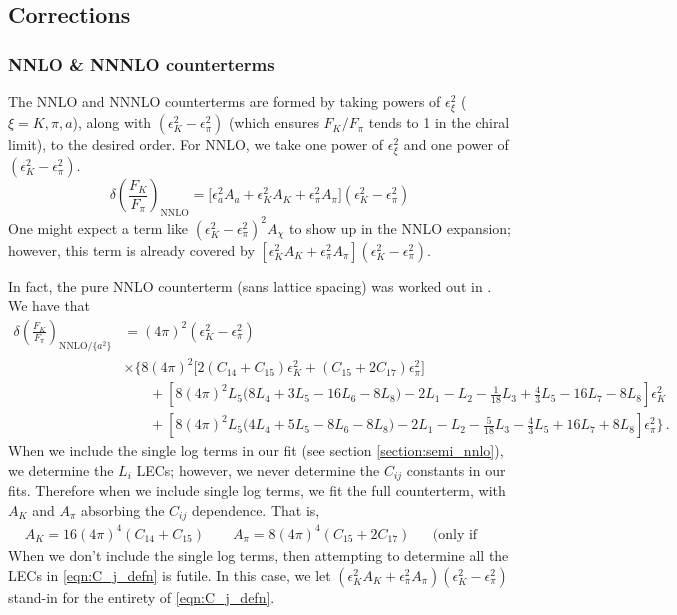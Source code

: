 \documentclass[prd,tightenlines,preprintnumbers,showpacs,superscriptaddress,notitlepage,eqsecnum,floatfix,notitlepage]{revtex4-1}
\begin{document}
\subsection{Corrections}

\subsubsection{NNLO \& NNNLO counterterms}
The NNLO and NNNLO counterterms are formed by taking powers of $\epsilon^2_\xi$ ($\xi = K, \pi, a$), along with $(\epsilon_K^2 - \epsilon_\pi^2)$ (which ensures $F_K / F_\pi$ tends to 1 in the chiral limit), to the desired order. For NNLO, we take one power of $\epsilon^2_\xi$ and one power of $(\epsilon_K^2 - \epsilon_\pi^2)$.
\begin{equation}
\delta\left(\frac{F_K}{F_\pi}\right)_\text{NNLO} = \bigg[
\epsilon_a^2  A_{a}
+\epsilon_K^2  A_{K}
+\epsilon_\pi^2  A_{\pi}
\bigg] (\epsilon_K^2 - \epsilon_\pi^2)
\end{equation}
One might expect a term like $(\epsilon_K^2 - \epsilon_\pi^2)^2 A_{\chi}$ to show up in the NNLO expansion; however, this term is already covered by $[\epsilon_K^2  A_{K}+\epsilon_\pi^2  A_{\pi}] (\epsilon_K^2 - \epsilon_\pi^2)$.

In fact, the pure NNLO counterterm (sans lattice spacing) was worked out in  \cite{Ananthanarayan:2017qmx}. We have that
\begin{align} \label{eqn:C_j_defn}
\delta\left(\frac{F_K}{F_\pi}\right)_{\text{NNLO} / \{a^2 \}}
&= (4 \pi)^2 \left(\epsilon_K^2 - \epsilon_\pi^2\right) \\
&\times \Bigg\{ 
8 (4 \pi)^2 \big[ 2 \left(C_{14} + C_{15}\right) \epsilon_K^2 + \left( C_{15} + 2 C_{17} \right) \epsilon_\pi^2 \big] \nonumber \\
&\phantom{= \Bigg\}} +  \left[ 8 (4 \pi)^2 L_5  \big( 8 L_4 + 3L_5 - 16 L_6 -8L_8 \big)
-2 L_1 - L_2 - \frac{1}{18} L_3 + \frac{4}{3} L_5 - 16 L_7 - 8 L_8
\right] \epsilon_K^2 \nonumber \\
&\phantom{= \Bigg\}} +  \left[ 8 (4 \pi)^2  L_5  \big( 4 L_4 + 5 L_5 - 8 L_6 - 8 L_8 \big)
-2 L_1 - L_2 - \frac{5}{18} L_3 - \frac{4}{3} L_5 + 16 L_7 + 8 L_8
\right] \epsilon_\pi^2 \nonumber 
\Bigg\} \, .
\end{align}
When we include the single log terms in our fit (see section \ref{section:semi_nnlo}), we determine the $L_i$ LECs; however, we never determine the $C_{ij}$ constants in our fits. Therefore when we include single log terms, we fit the full counterterm, with $A_K$ and $A_\pi$ absorbing the $C_{ij}$ dependence. That is,
\begin{align}
&A_K = 16 (4 \pi)^4 (C_{14} + C_{15}) \qquad A_\pi = 8 (4 \pi)^4 (C_{15} + 2 C_{17}) &&  \text{(only if including single log terms)}
\end{align}
When we don't include the single log terms, then attempting to determine all the LECs in \eqref{eqn:C_j_defn} is futile. In this case, we let $(\epsilon_K^2  A_{K} +\epsilon_\pi^2  A_{\pi}) (\epsilon_K^2 - \epsilon_\pi^2)$ stand-in for the entirety of \eqref{eqn:C_j_defn}.
\end{document}
